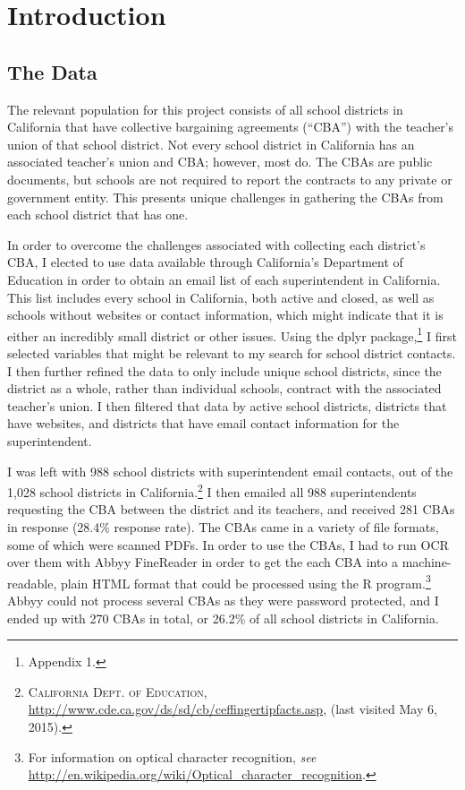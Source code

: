 \section{Introduction}
\subsection{The Data}

The relevant population for this project consists of all school districts in California that have collective bargaining agreements (“CBA”) with the teacher’s union of that school district. Not every school district in California has an associated teacher’s union and CBA; however, most do. The CBAs are public documents, but schools are not required to report the contracts to any private or government entity. This presents unique challenges in gathering the CBAs from each school district that has one. 
	
In order to overcome the challenges associated with collecting each district’s CBA, I elected to use data available through California’s Department of Education in order to obtain an email list of each superintendent in California. This list includes every school in California, both active and closed, as well as schools without websites or contact information, which might indicate that it is either an incredibly small district or other issues. Using the dplyr package,\footnote{\hspace{2ex}Appendix 1.} I first selected variables that might be relevant to my search for school district contacts. I then further refined the data to only include unique school districts, since the district as a whole, rather than individual schools, contract with the associated teacher’s union. I then filtered that data by active school districts, districts that have websites, and districts that have email contact information for the superintendent. 
	
I was left with 988 school districts with superintendent email contacts, out of the 1,028 school districts in California.\footnote{\hspace{2ex}\textsc{California Dept. of Education,} \url{http://www.cde.ca.gov/ds/sd/cb/ceffingertipfacts.asp}, (last visited May 6, 2015).}  I then emailed all 988 superintendents requesting the CBA between the district and its teachers, and received 281 CBAs in response (28.4\% response rate). The CBAs came in a variety of file formats, some of which were scanned PDFs. In order to use the CBAs, I had to run OCR over them with Abbyy FineReader in order to get the each CBA into a machine-readable, plain HTML format that could be processed using the R program.\footnote{\hspace{2ex}For information on optical character recognition, \textit{see} \url{http://en.wikipedia.org/wiki/Optical_character_recognition}.}  Abbyy could not process several CBAs as they were password protected, and I ended up with 270 CBAs in total, or 26.2\% of all school districts in California.
	

